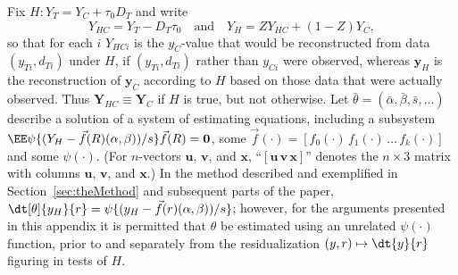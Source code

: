 
Fix $H: Y_T = Y_C + \tau_0 D_T$ and write
\begin{equation}
  \label{eq:yhc}
  {Y}_{HC} = {Y}_{T} - {D}_{T}\tau_{0}\quad
  \text{and}  \quad Y_{H} = ZY_{HC} + (1-Z)Y_{C},
\end{equation}
 so that for each $i$  ${Y}_{HC i}$ is the  $y_{C}$-value that would be
 reconstructed from data $(y_{Ti}, d_{Ti})$ under $H$, if $(y_{Ti},
 d_{Ti})$ rather than $y_{Ci}$ were observed, whereas $\mathbf{y}_{H}$ is the reconstruction of $\mathbf{y}_{C}$
 according to $H$ based on those data that were actually observed.  Thus $\mathbf{Y}_{HC} \equiv \mathbf{Y}_{C}$ if $H$ is true, but not otherwise.
Let $\bar\theta = (\bar\alpha, \bar\beta, \bar{s}, \ldots)$
describe a solution of a system of estimating equations, including a
subsystem $\EE \psi\{ (Y_{H} -
\vec{f}(R) (\alpha, \beta))/s\}\vec{f}(R) =
\mathbf{0}$, some $\vec{f}(\cdot) = [f_{0}(\cdot)\, f_{1}(\cdot)\, \ldots\,
f_{k}(\cdot)]$ and some $\psi(\cdot)$.  (For $n$-vectors $\mathbf{u}$, $\mathbf{v}$, and $\mathbf{x}$,
``$[\mathbf{u}\, \mathbf{v}\, \mathbf{x}]$'' denotes the $n\times 3$ matrix with
columns $\mathbf{u}$, $\mathbf{v}$, and $\mathbf{x}$.)  In the method
described and exemplified in Section~\ref{sec:theMethod} and
subsequent parts of the paper, $\dt[\theta]{y_{H} }{ r} = \psi\{ (y_{H} -
\vec{f}(r) (\alpha, \beta))/s\}$; however, for the arguments presented in
this appendix it is permitted that $\theta$ be estimated using an
unrelated $\psi(\cdot)$ function, prior to and
separately from the residualization $(y,r) \mapsto \dt{y }{ r}$ figuring in tests of $H$.

